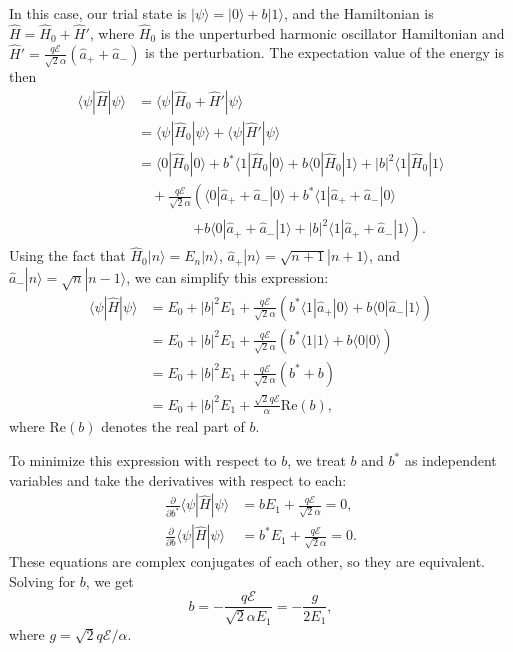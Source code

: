 \documentclass{article}
\begin{document}
In this case, our trial state is \(|\psi\rangle = |0\rangle + b |1\rangle\), and the Hamiltonian is \(\hat{H} = \hat{H}_0 + \hat{H}'\), where \(\hat{H}_0\) is the unperturbed harmonic oscillator Hamiltonian and \(\hat{H}' = \frac{q \mathcal{E}}{\sqrt{2} \alpha} (\hat{a}_+ + \hat{a}_-)\) is the perturbation.  The expectation value of the energy is then
\begin{align*}
\langle \psi | \hat{H} | \psi \rangle &= \langle \psi | \hat{H}_0 + \hat{H}' | \psi \rangle \\
&= \langle \psi | \hat{H}_0 | \psi \rangle + \langle \psi | \hat{H}' | \psi \rangle \\
&= \langle 0 | \hat{H}_0 | 0 \rangle + b^* \langle 1 | \hat{H}_0 | 0 \rangle + b \langle 0 | \hat{H}_0 | 1 \rangle + |b|^2 \langle 1 | \hat{H}_0 | 1 \rangle \\
&\quad + \frac{q \mathcal{E}}{\sqrt{2} \alpha} \left( \langle 0 | \hat{a}_+ + \hat{a}_- | 0 \rangle + b^* \langle 1 | \hat{a}_+ + \hat{a}_- | 0 \rangle \right. \\
&\qquad \qquad \left. + b \langle 0 | \hat{a}_+ + \hat{a}_- | 1 \rangle + |b|^2 \langle 1 | \hat{a}_+ + \hat{a}_- | 1 \rangle \right).
\end{align*}
Using the fact that \(\hat{H}_0 | n \rangle = E_n | n \rangle\), \(\hat{a}_+ | n \rangle = \sqrt{n+1} | n+1 \rangle\), and \(\hat{a}_- | n \rangle = \sqrt{n} | n-1 \rangle\), we can simplify this expression:
\begin{align*}
\langle \psi | \hat{H} | \psi \rangle &= E_0 + |b|^2 E_1 + \frac{q \mathcal{E}}{\sqrt{2} \alpha} \left( b^* \langle 1 | \hat{a}_+ | 0 \rangle + b \langle 0 | \hat{a}_- | 1 \rangle \right) \\
&= E_0 + |b|^2 E_1 + \frac{q \mathcal{E}}{\sqrt{2} \alpha} \left( b^* \langle 1 | 1 \rangle + b \langle 0 | 0 \rangle \right) \\
&= E_0 + |b|^2 E_1 + \frac{q \mathcal{E}}{\sqrt{2} \alpha} (b^* + b) \\
&= E_0 + |b|^2 E_1 + \frac{\sqrt{2} q \mathcal{E}}{\alpha} \text{Re}(b),
\end{align*}
where \(\text{Re}(b)\) denotes the real part of \(b\).

To minimize this expression with respect to \(b\), we treat \(b\) and \(b^*\) as independent variables and take the derivatives with respect to each:
\begin{align*}
\frac{\partial}{\partial b^*} \langle \psi | \hat{H} | \psi \rangle &= b E_1 + \frac{q \mathcal{E}}{\sqrt{2} \alpha} = 0, \\
\frac{\partial}{\partial b} \langle \psi | \hat{H} | \psi \rangle &= b^* E_1 + \frac{q \mathcal{E}}{\sqrt{2} \alpha} = 0.
\end{align*}
These equations are complex conjugates of each other, so they are equivalent.  Solving for \(b\), we get
\[
b = -\frac{q \mathcal{E}}{\sqrt{2} \alpha E_1} = -\frac{g}{2 E_1},
\]
where \(g = \sqrt{2} q \mathcal{E} / \alpha\).
\end{document}
